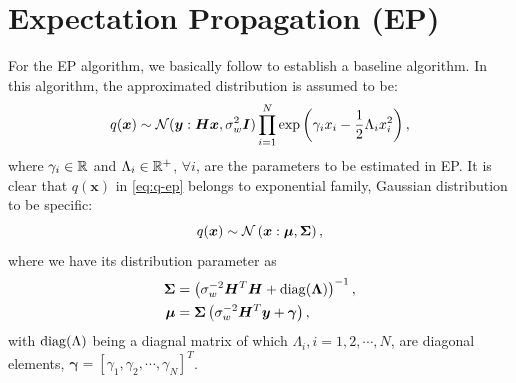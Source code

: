 \documentclass{article}
\DeclarePairedDelimiter{\diagfences}{(}{)}
\newcommand{\diag}{\operatorname{diag}\diagfences}
\begin{document}
\section{Expectation Propagation (EP)} \label{sec:EP}
For the EP algorithm, we basically follow \cite{cespedes2014mimo} to establish a baseline algorithm.
In this algorithm, the approximated distribution is assumed to be:
\begin{equation}\label{eq:q-ep}
  q(\bm{x}) \sim \mathcal{N}(\bm{y}: \bm{H}\bm{x}, \sigma_{w}^2\bm{I}) \prod_{i=1}^{N} \exp\left( \gamma_i x_i - \frac{1}{2}\Lambda_i x_i^2 \right),
\end{equation}
where $\gamma_i \in \mathbb{R}$ and $\Lambda_i \in \mathbb{R}^{+}$, $\forall i$, are the parameters to be estimated in EP. It is clear that $q(\bm{x})$ in \eqref{eq:q-ep} belongs to exponential family, Gaussian distribution to be specific:
\begin{equation}
  q(\bm{x}) \sim \mathcal{N}\left(\bm{x}:\bm{\mu}, \bm{\Sigma} \right),
\end{equation}
where we have its distribution parameter as
\begin{align}
  \bm{\Sigma} &= \left( \sigma_{w}^{-2}\bm{H}^{T}\bm{H} +  \diag{\bm{\Lambda}} \right)^{-1}, \\
  \bm{\mu} & = \bm{\Sigma}\left( \sigma_{w}^{-2}\bm{H}^{T}\bm{y} +  \bm{\gamma} \right),
\end{align}
with $\diag{\Lambda}$ being a diagnal matrix of which $\Lambda_i, i=1, 2, \cdots, N$, are diagonal elements, $\bm{\gamma}=[\gamma_1, \gamma_2, \cdots, \gamma_N]^{T}$.
\end{document}
